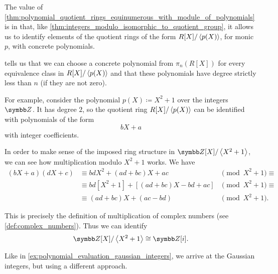 \begin{example}\label{ex:polynomial_quotient_rings_gaussian_integers}
  The value of \cref{thm:polynomial_quotient_rings_equinumerous_with_module_of_polynomials} is in that, like \cref{thm:integers_modulo_isomorphic_to_quotient_group}, it allows us to identify elements of the quotient rings of the form \( R[X] / \left\langle p(X) \right\rangle \), for monic \( p \), with concrete polynomials.

   tells us that we can choose a concrete polynomial from \( \pi_n(R[X]) \) for every equivalence class in \( R[X] / \left\langle p(X) \right\rangle \) and that these polynomials have degree strictly less than \( n \) (if they are not zero).

  For example, consider the polynomial \( p(X) \coloneqq X^2 + 1 \) over the integers \( \Z \). It has degree \( 2 \), so the quotient ring \( R[X] / \left\langle p(X) \right\rangle \) can be identified with polynomials of the form
  \begin{equation}\label{ex:polynomial_quotient_rings_gaussian_integers/linear_polynomial}
    bX + a
  \end{equation}
  with integer coefficients.

  In order to make sense of the imposed ring structure in \( \Z[X] / \Gen{X^2 + 1} \), we can see how multiplication modulo \( X^2 + 1 \) works. We have
  \begin{align*}
    (bX + a) (dX + c)
    &\equiv
    bdX^2 + (ad + bc)X + ac
    &\pmod {X^2 + 1} \equiv \\ &\equiv
    bd[X^2 + 1] + [(ad + bc)X - bd + ac]
    &\pmod {X^2 + 1} \equiv \\ &\equiv
    (ad + bc)X + (ac - bd)
    &\pmod {X^2 + 1}. \phantom{\equiv}
  \end{align*}

  This is precisely the definition of multiplication of complex numbers (see \cref{def:complex_numbers}). Thus we can identify
  \begin{equation*}
    \Z[X] / \Gen{X^2 + 1} \cong \Z[i].
  \end{equation*}

  Like in \cref{ex:polynomial_evaluation_gaussian_integers}, we arrive at the Gaussian integers, but using a different approach.
\end{example}

